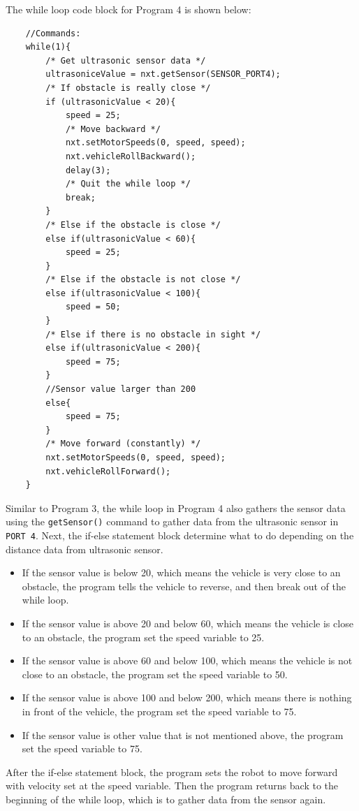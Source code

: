 The while loop code block for Program 4 is shown below:
\begin{verbatim}
    //Commands:
    while(1){
        /* Get ultrasonic sensor data */
        ultrasoniceValue = nxt.getSensor(SENSOR_PORT4);
        /* If obstacle is really close */
        if (ultrasonicValue < 20){
            speed = 25;
            /* Move backward */
            nxt.setMotorSpeeds(0, speed, speed);
            nxt.vehicleRollBackward();
            delay(3);
            /* Quit the while loop */
            break;
        }
        /* Else if the obstacle is close */
        else if(ultrasonicValue < 60){
            speed = 25;
        }
        /* Else if the obstacle is not close */
        else if(ultrasonicValue < 100){
            speed = 50;
        }
        /* Else if there is no obstacle in sight */
        else if(ultrasonicValue < 200){
            speed = 75;
        }
        //Sensor value larger than 200
        else{
            speed = 75;
        }
        /* Move forward (constantly) */
        nxt.setMotorSpeeds(0, speed, speed);
        nxt.vehicleRollForward();
    }
\end{verbatim}
\noindent
Similar to Program 3, the while loop in Program 4 also gathers the sensor data using the
    \verb+getSensor()+ command to gather data from the ultrasonic sensor in \verb+PORT 4+.
Next, the if-else statement block determine what to do depending on the distance data from ultrasonic sensor.
\begin{itemize}
\item If the sensor value is below 20, which means the vehicle is very close to an obstacle, the program tells the
    vehicle to reverse, and then break out of the while loop.
\item If the sensor value is above 20 and below 60, which means the vehicle is close to an obstacle, the
    program set the speed variable to 25.
\item If the sensor value is above 60 and below 100, which means the vehicle is not close to an obstacle, the
    program set the speed variable to 50.
\item If the sensor value is above 100 and below 200, which means there is nothing in front of the vehicle,
    the program set the speed variable to 75.
\item If the sensor value is other value that is not mentioned above, the program set the speed variable to 75.
\end{itemize}
After the if-else statement block, the program sets the robot to move forward with velocity set at the speed variable.
Then the program returns back to the beginning of the while loop, which is to gather data from the sensor again.

